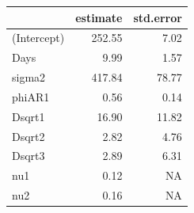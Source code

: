 \documentclass[
  ignorenonframetext,
]{beamer}
\newenvironment{Shaded}{\begin{snugshade}}{\end{snugshade}}
\newcommand{\CommentTok}[1]{\textcolor[rgb]{0.56,0.35,0.01}{\textit{#1}}}
\newcommand{\DataTypeTok}[1]{\textcolor[rgb]{0.13,0.29,0.53}{#1}}
\newcommand{\DecValTok}[1]{\textcolor[rgb]{0.00,0.00,0.81}{#1}}
\newcommand{\KeywordTok}[1]{\textcolor[rgb]{0.13,0.29,0.53}{\textbf{#1}}}
\newcommand{\NormalTok}[1]{#1}
\newcommand{\OperatorTok}[1]{\textcolor[rgb]{0.81,0.36,0.00}{\textbf{#1}}}
\newcommand{\StringTok}[1]{\textcolor[rgb]{0.31,0.60,0.02}{#1}}
\begin{document}
\begin{frame}[fragile]

\scriptsize

\begin{Shaded}
\end{Shaded}

\begin{longtable}[]{@{}lrr@{}}
\toprule
& estimate & std.error\tabularnewline
\midrule
\endhead
(Intercept) & 252.55 & 7.02\tabularnewline
Days & 9.99 & 1.57\tabularnewline
sigma2 & 417.84 & 78.77\tabularnewline
phiAR1 & 0.56 & 0.14\tabularnewline
Dsqrt1 & 16.90 & 11.82\tabularnewline
Dsqrt2 & 2.82 & 4.76\tabularnewline
Dsqrt3 & 2.89 & 6.31\tabularnewline
nu1 & 0.12 & NA\tabularnewline
nu2 & 0.16 & NA\tabularnewline
\bottomrule
\end{longtable}

\end{frame}
\end{document}
